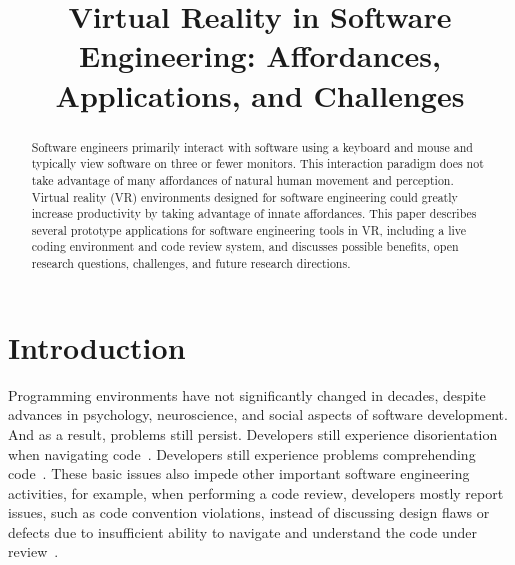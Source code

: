 \documentclass[conference]{IEEEtran}
\begin{document}
\title{Virtual Reality in Software Engineering: Affordances, Applications, and Challenges}

\author{
\and
{}
\and
{}
}

\maketitle
\begin{abstract}
Software engineers primarily interact with software using a keyboard and mouse and typically view software on three or fewer monitors.
This interaction paradigm does not take advantage of many affordances of natural human movement and perception.
Virtual reality (VR) environments designed for software engineering could greatly increase productivity by taking advantage of innate affordances.
This paper describes several prototype applications for software engineering tools in VR, including a live coding environment and code review system, and discusses possible benefits, open research questions, challenges, and future research directions.
\end{abstract}

\section{Introduction}

Programming environments have not significantly changed in decades, 
despite advances in psychology, neuroscience, and social aspects of software development.
And as a result, problems still persist.  Developers still experience disorientation when navigating code~\cite{PatchWorks?}.
Developers still experience problems comprehending code~\cite{Tobias}.  These basic issues also impede other important software engineering activities, for example,
when performing a code review, developers mostly report issues, such as code convention violations, instead of discussing design flaws or defects
due to insufficient ability to navigate and understand the code under review~\cite{bacchelli:ModernCodeReviewChallenges}.  
\end{document}
